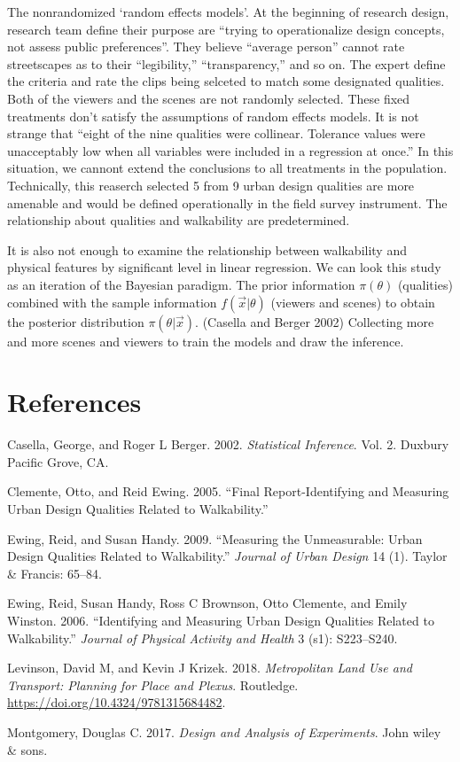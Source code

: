 \documentclass[12pt,]{article}
\begin{document}
The nonrandomized `random effects models'. At the beginning of research
design, research team define their purpose are ``trying to
operationalize design concepts, not assess public preferences''. They
believe ``average person'' cannot rate streetscapes as to their
``legibility,'' ``transparency,'' and so on. The expert define the
criteria and rate the clips being selceted to match some designated
qualities. Both of the viewers and the scenes are not randomly selected.
These fixed treatments don't satisfy the assumptions of random effects
models. It is not strange that ``eight of the nine qualities were
collinear. Tolerance values were unacceptably low when all variables
were included in a regression at once.'' In this situation, we cannont
extend the conclusions to all treatments in the population. Technically,
this reaserch selected 5 from 9 urban design qualities are more amenable
and would be defined operationally in the field survey instrument. The
relationship about qualities and walkability are predetermined.

It is also not enough to examine the relationship between walkability
and physical features by significant level in linear regression. We can
look this study as an iteration of the Bayesian paradigm. The prior
information \(\pi(\theta)\) (qualities) combined with the sample
information \(f(\vec x|\theta)\) (viewers and scenes) to obtain the
posterior distribution \(\pi(\theta|\vec x)\). (Casella and Berger 2002)
Collecting more and more scenes and viewers to train the models and draw
the inference.

\hypertarget{references}{%
\section*{References}\label{references}}

\hypertarget{refs}{}
\leavevmode\hypertarget{ref-casella2002statistical}{}%
Casella, George, and Roger L Berger. 2002. \emph{Statistical Inference}.
Vol. 2. Duxbury Pacific Grove, CA.

\leavevmode\hypertarget{ref-clemente2005identifying}{}%
Clemente, Otto, and Reid Ewing. 2005. ``Final Report-Identifying and
Measuring Urban Design Qualities Related to Walkability.''

\leavevmode\hypertarget{ref-ewing2009measuring}{}%
Ewing, Reid, and Susan Handy. 2009. ``Measuring the Unmeasurable: Urban
Design Qualities Related to Walkability.'' \emph{Journal of Urban
Design} 14 (1). Taylor \& Francis: 65--84.

\leavevmode\hypertarget{ref-ewing2006identifying}{}%
Ewing, Reid, Susan Handy, Ross C Brownson, Otto Clemente, and Emily
Winston. 2006. ``Identifying and Measuring Urban Design Qualities
Related to Walkability.'' \emph{Journal of Physical Activity and Health}
3 (s1): S223--S240.

\leavevmode\hypertarget{ref-levinson2018metropolitan}{}%
Levinson, David M, and Kevin J Krizek. 2018. \emph{Metropolitan Land Use
and Transport: Planning for Place and Plexus}. Routledge.
\url{https://doi.org/10.4324/9781315684482}.

\leavevmode\hypertarget{ref-montgomery2017design}{}%
Montgomery, Douglas C. 2017. \emph{Design and Analysis of Experiments}.
John wiley \& sons.
\end{document}
